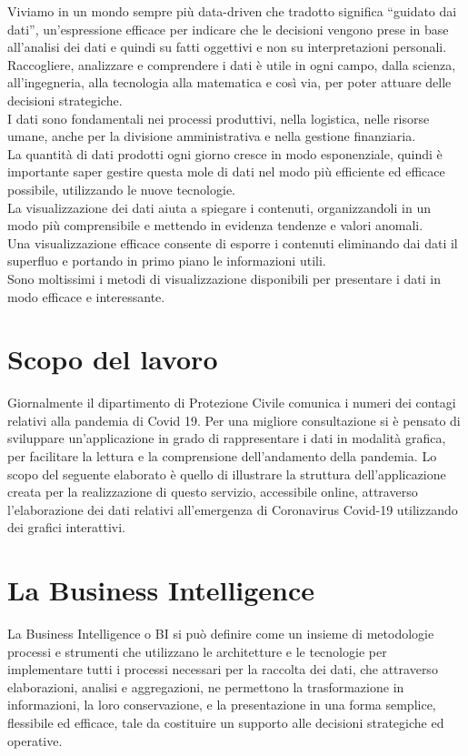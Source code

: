 
Viviamo in un mondo sempre più data-driven che tradotto significa “guidato dai dati”, un’espressione efficace per indicare che le decisioni vengono prese in base all’analisi dei dati e quindi su fatti oggettivi e non su interpretazioni personali.
Raccogliere, analizzare e comprendere i dati è utile in ogni campo, dalla scienza, all'ingegneria, alla tecnologia alla matematica e così via, per poter attuare delle decisioni strategiche.\\
I dati sono fondamentali nei processi produttivi, nella logistica, nelle risorse umane, anche per la divisione amministrativa e nella gestione finanziaria.\\
La quantità di dati prodotti ogni giorno cresce in modo esponenziale, quindi è importante saper gestire questa mole di dati nel modo più efficiente ed efficace possibile, utilizzando le nuove tecnologie.\\
La visualizzazione dei dati aiuta a spiegare i contenuti, organizzandoli in un modo più comprensibile e mettendo in evidenza tendenze e valori anomali.\\
Una visualizzazione efficace consente di esporre i contenuti eliminando dai dati il superfluo e portando in primo piano le informazioni utili.\\
Sono moltissimi i metodi di visualizzazione disponibili per presentare i dati in modo efficace e interessante.


\section{Scopo del lavoro}

Giornalmente il dipartimento di Protezione Civile comunica i numeri dei contagi relativi alla pandemia di Covid 19.
Per una migliore consultazione si è pensato di sviluppare un’applicazione in grado di rappresentare i dati in modalità grafica, per facilitare la lettura e la comprensione dell’andamento della pandemia.
Lo scopo del seguente elaborato è quello di illustrare la struttura dell'applicazione creata per la realizzazione di questo servizio, accessibile online, attraverso l’elaborazione dei dati relativi all’emergenza di Coronavirus Covid-19 utilizzando dei grafici interattivi.

\section{La Business Intelligence}
La Business Intelligence o BI si può definire come un insieme di metodologie processi e strumenti che utilizzano le architetture e le tecnologie per implementare tutti i processi necessari per la raccolta dei dati, che attraverso elaborazioni, analisi e aggregazioni, ne permettono la trasformazione in informazioni, la loro conservazione, e la presentazione in una forma semplice, flessibile ed efficace, tale da costituire un supporto alle decisioni strategiche ed operative.
 
